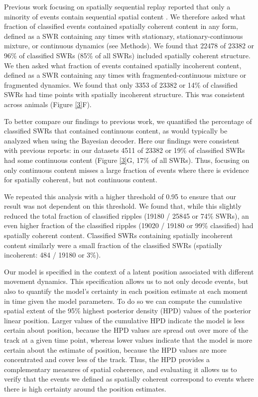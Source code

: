 \documentclass[times, twoside]{zHenriquesLab-StyleBioRxiv}
\begin{document}
Previous work focusing on spatially sequential replay reported that only a minority of events contain sequential spatial content \cite{KarlssonAwakereplayremote2009, FosterReversereplaybehavioural2006, DavidsonHippocampalReplayExtended2009}. We therefore asked what fraction of classified events contained spatially coherent content in any form, defined as a SWR containing any times with stationary, stationary-continuous mixture, or continuous dynamics (see Methods). We found that 22478 of 23382 or 96\% of classified SWRs (85\% of all SWRs) included spatially coherent structure. We then asked what fraction of events contained spatially incoherent content, defined as a SWR containing any times with fragmented-continuous mixture or fragmented dynamics. We found that only 3353 of 23382 or 14\% of classified SWRs had time points with spatially incoherent structure. This was consistent across animals (Figure \ref{3}F).

To better compare our findings to previous work, we quantified the percentage of classified SWRs that contained continuous content, as would typically be analyzed when using the Bayesian decoder. Here our findings were consistent with previous reports: in our datasets 4511 of 23382 or 19\% of classified SWRs had some continuous content (Figure \ref{3}G, 17\% of all SWRs). Thus, focusing on only continuous content misses a large fraction of events where there is evidence for spatially coherent, but not continuous content.

We repeated this analysis with a higher threshold of 0.95 to ensure that our result was not dependent on this threshold. We found that, while this slightly reduced the total fraction of classified ripples (19180 / 25845 or 74\% SWRs), an even higher fraction of the classified ripples (19020 / 19180 or 99\% classified) had spatially coherent content. Classified SWRs containing spatially incoherent content similarly were a small fraction of the classified SWRs (spatially incoherent: 484 / 19180 or 3\%).

Our model is specified in the context of a latent position associated with different movement dynamics. This specification allows us to not only decode events, but also to quantify the model's certainty in each position estimate at each moment in time given the model parameters. To do so we can compute the cumulative spatial extent of the 95\% highest posterior density (HPD) values of the posterior linear position. Larger values of the cumulative HPD indicate the model is less certain about position, because the HPD values are spread out over more of the track at a given time point, whereas lower values indicate that the model is more certain about the estimate of position, because the HPD values are more concentrated and cover less of the track. Thus, the HPD provides a complementary measures of spatial coherence, and evaluating it allows us to verify that the events we defined as spatially coherent correspond to events where there is high certainty around the position estimates.
\end{document}
